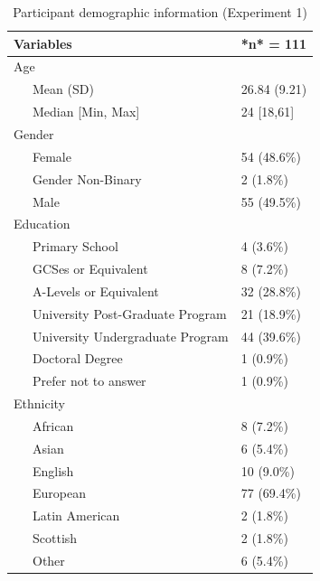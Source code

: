\documentclass[
  donotrepeattitle,doc, 12pt, a4paper,floatsintext]{apa7}
\begin{document}
\begin{table}[tbp]

\begin{center}
\begin{threeparttable}

\caption{\label{tab:unnamed-chunk-3}Participant demographic information (Experiment 1)}

\small{

\begin{tabular}{ll}
\toprule
Variables & *n* = 111\\
\midrule
Age & \\
\ \ \ Mean (SD) & 26.84 (9.21)\\
\ \ \ Median [Min, Max] & 24 [18,61]\\
Gender & \\
\ \ \ Female & 54 (48.6\%)\\
\ \ \ Gender Non-Binary & 2 (1.8\%)\\
\ \ \ Male & 55 (49.5\%)\\
Education & \\
\ \ \ Primary School & 4 (3.6\%)\\
\ \ \ GCSes or Equivalent & 8 (7.2\%)\\
\ \ \ A-Levels or Equivalent & 32 (28.8\%)\\
\ \ \ University Post-Graduate Program & 21 (18.9\%)\\
\ \ \ University Undergraduate Program & 44 (39.6\%)\\
\ \ \ Doctoral Degree & 1 (0.9\%)\\
\ \ \ Prefer not to answer & 1 (0.9\%)\\
Ethnicity & \\
\ \ \ African & 8 (7.2\%)\\
\ \ \ Asian & 6 (5.4\%)\\
\ \ \ English & 10 (9.0\%)\\
\ \ \ European & 77 (69.4\%)\\
\ \ \ Latin American & 2 (1.8\%)\\
\ \ \ Scottish & 2 (1.8\%)\\
\ \ \ Other & 6 (5.4\%)\\
\bottomrule
\end{tabular}

}

\end{threeparttable}
\end{center}

\end{table}
\end{document}
